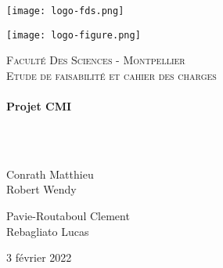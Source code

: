 \documentclass[a4paper, 12pt]{article}
\begin{document}
\begin{titlepage}
  \begin{sffamily}
  \begin{center}
  

\begin{minipage}[c]{.46\linewidth}
     \begin{center}
             \texttt{[image: logo-fds.png]}
         \end{center}
   \end{minipage} \hfill
   \begin{minipage}[c]{.46\linewidth}
    \begin{center}
            \texttt{[image: logo-figure.png]}
        \end{center}
 \end{minipage}
\newline \newline


    \textsc{\LARGE Faculté Des Sciences - Montpellier}\\[2cm]

    \textsc{\Large Etude de faisabilité et cahier des charges}\\[1.5cm]

    \HRule \\[0.4cm]
    { \huge \bfseries Projet CMI\\[0.4cm] }

    \HRule \\[2cm]
    \\[2cm]

    \begin{minipage}{0.4\textwidth}
      \begin{flushleft} \large
        Conrath Matthieu\\
        Robert Wendy\\
      \end{flushleft}
    \end{minipage}
    \begin{minipage}{0.4\textwidth}
      \begin{flushright} \large
       Pavie-Routaboul Clement\\
        Rebagliato Lucas\\
      \end{flushright}
    \end{minipage}

    \vfill

    {\large 3 février 2022}

  \end{center}
  \end{sffamily}
\end{titlepage}
\end{document}
